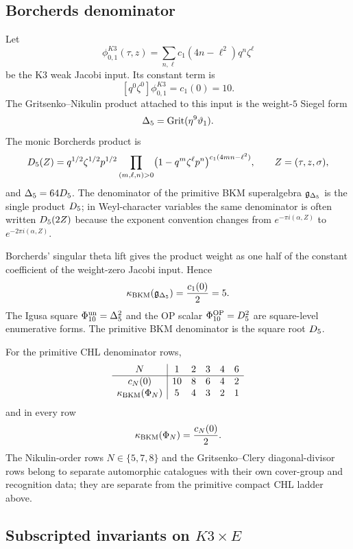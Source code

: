 \subsection*{Borcherds denominator}

Let
\[
  \phi_{0,1}^{K3}(\tau,z)
  =
  \sum_{n,\ell}c_1(4n-\ell^2)q^n\zeta^\ell
\]
be the K3 weak Jacobi input.  Its constant term is
\[
  [q^0\zeta^0]\phi_{0,1}^{K3}=c_1(0)=10.
\]
The Gritsenko--Nikulin product attached to this input is the
weight-$5$ Siegel form
\[
  \Delta_5=\mathrm{Grit}(\eta^9\vartheta_1).
\]
The monic Borcherds product is
\[
  D_5(Z)
  =
  q^{1/2}\zeta^{1/2}p^{1/2}
  \prod_{(m,\ell,n)>0}
  \bigl(1-q^m\zeta^\ell p^n\bigr)^{c_1(4mn-\ell^2)},
  \qquad
  Z=(\tau,z,\sigma),
\]
and $\Delta_5=64D_5$.  The denominator of the primitive BKM
superalgebra $\mathfrak g_{\Delta_5}$ is the single product
$D_5$; in Weyl-character variables the same denominator is often
written $D_5(2Z)$ because the exponent convention changes from
$e^{-\pi i(\alpha,Z)}$ to $e^{-2\pi i(\alpha,Z)}$.

Borcherds' singular theta lift gives the product weight as one half of
the constant coefficient of the weight-zero Jacobi input.  Hence
\[
  \kappa_{\mathrm{BKM}}(\mathfrak g_{\Delta_5})
  =
  \frac{c_1(0)}{2}
  =
  5 .
\]
The Igusa square $\Phi_{10}^{\mathrm{un}}=\Delta_5^2$ and the OP scalar
$\Phi_{10}^{\mathrm{OP}}=D_5^2$ are square-level enumerative forms.  The primitive
BKM denominator is the square root $D_5$.

For the primitive CHL denominator rows,
\[
\begin{array}{c|ccccc}
N & 1 & 2 & 3 & 4 & 6\\
\hline
c_N(0) & 10 & 8 & 6 & 4 & 2\\
\kappa_{\mathrm{BKM}}(\Phi_N) & 5 & 4 & 3 & 2 & 1
\end{array}
\]
and in every row
\[
  \kappa_{\mathrm{BKM}}(\Phi_N)=\frac{c_N(0)}{2}.
\]
The Nikulin-order rows $N\in\{5,7,8\}$ and the Gritsenko--Clery
diagonal-divisor rows belong to separate automorphic catalogues with
their own cover-group and recognition data; they are separate from the
primitive compact CHL ladder above.

\subsection*{Subscripted invariants on $K3\times E$}

